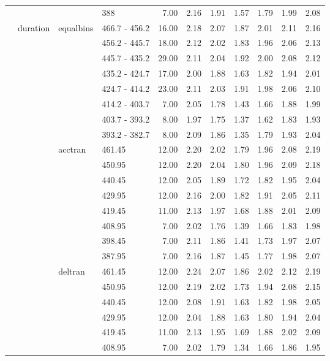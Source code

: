 \begin{longtable}{llllrrrrrrr}
   &  &  & 388 & 7.00 & 2.16 & 1.91 & 1.57 & 1.79 & 1.99 & 2.08 \\ 
   & duration & equalbins & 466.7 - 456.2 & 16.00 & 2.18 & 2.07 & 1.87 & 2.01 & 2.11 & 2.16 \\ 
   &  &  & 456.2 - 445.7 & 18.00 & 2.12 & 2.02 & 1.83 & 1.96 & 2.06 & 2.13 \\ 
   &  &  & 445.7 - 435.2 & 29.00 & 2.11 & 2.04 & 1.92 & 2.00 & 2.08 & 2.12 \\ 
   &  &  & 435.2 - 424.7 & 17.00 & 2.00 & 1.88 & 1.63 & 1.82 & 1.94 & 2.01 \\ 
   &  &  & 424.7 - 414.2 & 23.00 & 2.11 & 2.03 & 1.91 & 1.98 & 2.06 & 2.10 \\ 
   &  &  & 414.2 - 403.7 & 7.00 & 2.05 & 1.78 & 1.43 & 1.66 & 1.88 & 1.99 \\ 
   &  &  & 403.7 - 393.2 & 8.00 & 1.97 & 1.75 & 1.37 & 1.62 & 1.83 & 1.93 \\ 
   &  &  & 393.2 - 382.7 & 8.00 & 2.09 & 1.86 & 1.35 & 1.79 & 1.93 & 2.04 \\ 
   &  & acctran & 461.45 & 12.00 & 2.20 & 2.02 & 1.79 & 1.96 & 2.08 & 2.19 \\ 
   &  &  & 450.95 & 12.00 & 2.20 & 2.04 & 1.80 & 1.96 & 2.09 & 2.18 \\ 
   &  &  & 440.45 & 12.00 & 2.05 & 1.89 & 1.72 & 1.82 & 1.95 & 2.04 \\ 
   &  &  & 429.95 & 12.00 & 2.16 & 2.00 & 1.82 & 1.91 & 2.05 & 2.11 \\ 
   &  &  & 419.45 & 11.00 & 2.13 & 1.97 & 1.68 & 1.88 & 2.01 & 2.09 \\ 
   &  &  & 408.95 & 7.00 & 2.02 & 1.76 & 1.39 & 1.66 & 1.83 & 1.98 \\ 
   &  &  & 398.45 & 7.00 & 2.11 & 1.86 & 1.41 & 1.73 & 1.97 & 2.07 \\ 
   &  &  & 387.95 & 7.00 & 2.16 & 1.87 & 1.45 & 1.77 & 1.98 & 2.07 \\ 
   &  & deltran & 461.45 & 12.00 & 2.24 & 2.07 & 1.86 & 2.02 & 2.12 & 2.19 \\ 
   &  &  & 450.95 & 12.00 & 2.19 & 2.02 & 1.73 & 1.94 & 2.08 & 2.15 \\ 
   &  &  & 440.45 & 12.00 & 2.08 & 1.91 & 1.63 & 1.82 & 1.98 & 2.05 \\ 
   &  &  & 429.95 & 12.00 & 2.04 & 1.88 & 1.63 & 1.80 & 1.94 & 2.04 \\ 
   &  &  & 419.45 & 11.00 & 2.13 & 1.95 & 1.69 & 1.88 & 2.02 & 2.09 \\ 
   &  &  & 408.95 & 7.00 & 2.02 & 1.79 & 1.34 & 1.66 & 1.86 & 1.95 \\ 

\end{longtable}
